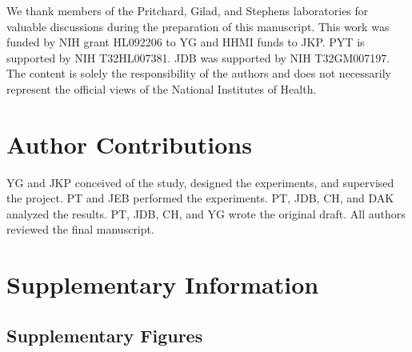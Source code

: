 We thank members of the Pritchard, Gilad, and Stephens laboratories
for valuable discussions during the preparation of this
manuscript. This work was funded by NIH grant HL092206 to YG and HHMI
funds to JKP. PYT is supported by NIH T32HL007381. JDB was supported
by NIH T32GM007197.  The content is solely the responsibility of the
authors and does not necessarily represent the official views of the
National Institutes of Health.

\section{Author Contributions}\label{ch04-author-contributions}

YG and JKP conceived of the study, designed the experiments, and
supervised the project. PT and JEB performed the experiments. PT, JDB,
CH, and DAK analyzed the results. PT, JDB, CH, and YG wrote the
original draft. All authors reviewed the final manuscript.

\section{Supplementary Information}\label{ch04-supplementary-information}

\subsection{Supplementary Figures}\label{ch04-supplementary-figures}

\clearpage

